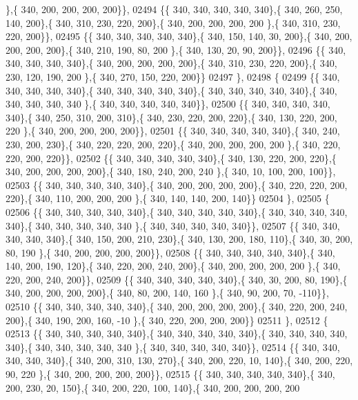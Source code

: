 \begin{DoxyCode}
      \},\{ 340, 200, 200, 200, 200\}\},
02494 \{\{ 340, 340, 340, 340, 340\},\{ 340, 260, 250, 140, 200\},\{ 340, 310, 230, 220, 200\},\{ 340, 200, 200, 200, 200
      \},\{ 340, 310, 230, 220, 200\}\},
02495 \{\{ 340, 340, 340, 340, 340\},\{ 340, 150, 140,  30, 200\},\{ 340, 200, 200, 200, 200\},\{ 340, 210, 190,  80, 200
      \},\{ 340, 130,  20,  90, 200\}\},
02496 \{\{ 340, 340, 340, 340, 340\},\{ 340, 200, 200, 200, 200\},\{ 340, 310, 230, 220, 200\},\{ 340, 230, 120, 190, 200
      \},\{ 340, 270, 150, 220, 200\}\}
02497 \},
02498 \{
02499 \{\{ 340, 340, 340, 340, 340\},\{ 340, 340, 340, 340, 340\},\{ 340, 340, 340, 340, 340\},\{ 340, 340, 340, 340, 340
      \},\{ 340, 340, 340, 340, 340\}\},
02500 \{\{ 340, 340, 340, 340, 340\},\{ 340, 250, 310, 200, 310\},\{ 340, 230, 220, 200, 220\},\{ 340, 130, 220, 200, 220
      \},\{ 340, 200, 200, 200, 200\}\},
02501 \{\{ 340, 340, 340, 340, 340\},\{ 340, 240, 230, 200, 230\},\{ 340, 220, 220, 200, 220\},\{ 340, 200, 200, 200, 200
      \},\{ 340, 220, 220, 200, 220\}\},
02502 \{\{ 340, 340, 340, 340, 340\},\{ 340, 130, 220, 200, 220\},\{ 340, 200, 200, 200, 200\},\{ 340, 180, 240, 200, 240
      \},\{ 340,  10, 100, 200, 100\}\},
02503 \{\{ 340, 340, 340, 340, 340\},\{ 340, 200, 200, 200, 200\},\{ 340, 220, 220, 200, 220\},\{ 340, 110, 200, 200, 200
      \},\{ 340, 140, 140, 200, 140\}\}
02504 \},
02505 \{
02506 \{\{ 340, 340, 340, 340, 340\},\{ 340, 340, 340, 340, 340\},\{ 340, 340, 340, 340, 340\},\{ 340, 340, 340, 340, 340
      \},\{ 340, 340, 340, 340, 340\}\},
02507 \{\{ 340, 340, 340, 340, 340\},\{ 340, 150, 200, 210, 230\},\{ 340, 130, 200, 180, 110\},\{ 340,  30, 200,  80, 190
      \},\{ 340, 200, 200, 200, 200\}\},
02508 \{\{ 340, 340, 340, 340, 340\},\{ 340, 140, 200, 190, 120\},\{ 340, 220, 200, 240, 200\},\{ 340, 200, 200, 200, 200
      \},\{ 340, 220, 200, 240, 200\}\},
02509 \{\{ 340, 340, 340, 340, 340\},\{ 340,  30, 200,  80, 190\},\{ 340, 200, 200, 200, 200\},\{ 340,  80, 200, 140, 160
      \},\{ 340,  90, 200,  70, -110\}\},
02510 \{\{ 340, 340, 340, 340, 340\},\{ 340, 200, 200, 200, 200\},\{ 340, 220, 200, 240, 200\},\{ 340, 190, 200, 160, -10
      \},\{ 340, 220, 200, 200, 200\}\}
02511 \},
02512 \{
02513 \{\{ 340, 340, 340, 340, 340\},\{ 340, 340, 340, 340, 340\},\{ 340, 340, 340, 340, 340\},\{ 340, 340, 340, 340, 340
      \},\{ 340, 340, 340, 340, 340\}\},
02514 \{\{ 340, 340, 340, 340, 340\},\{ 340, 200, 310, 130, 270\},\{ 340, 200, 220,  10, 140\},\{ 340, 200, 220,  90, 220
      \},\{ 340, 200, 200, 200, 200\}\},
02515 \{\{ 340, 340, 340, 340, 340\},\{ 340, 200, 230,  20, 150\},\{ 340, 200, 220, 100, 140\},\{ 340, 200, 200, 200, 200

\end{DoxyCode}

